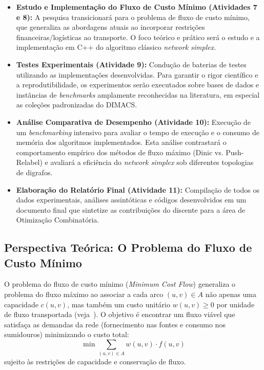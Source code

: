 \documentclass[12pt,a4paper]{article}
\begin{document}
\begin{itemize}
    \item \textbf{Estudo e Implementação do Fluxo de Custo Mínimo (Atividades 7 e 8):} A pesquisa transicionará para o problema de fluxo de custo mínimo, que generaliza as abordagens atuais ao incorporar restrições financeiras/logísticas ao transporte. O foco teórico e prático será o estudo e a implementação em C++ do algoritmo clássico \textit{network simplex}.
    \item \textbf{Testes Experimentais (Atividade 9):} Condução de baterias de testes utilizando as implementações desenvolvidas. Para garantir o rigor científico e a reprodutibilidade, os experimentos serão executados sobre bases de dados e instâncias de \textit{benchmarks} amplamente reconhecidas na literatura, em especial as coleções padronizadas do DIMACS.
    \item \textbf{Análise Comparativa de Desempenho (Atividade 10):} Execução de um \textit{benchmarking} intensivo para avaliar o tempo de execução e o consumo de memória dos algoritmos implementados. Esta análise contrastará o comportamento empírico dos métodos de fluxo máximo (Dinic vs. Push-Relabel) e avaliará a eficiência do \textit{network simplex} sob diferentes topologias de digrafos.
    \item \textbf{Elaboração do Relatório Final (Atividade 11):} Compilação de todos os dados experimentais, análises assintóticas e códigos desenvolvidos em um documento final que sintetize as contribuições do discente para a área de Otimização Combinatória.
\end{itemize}

\subsection{Perspectiva Teórica: O Problema do Fluxo de Custo Mínimo}

O problema do fluxo de custo mínimo (\textit{Minimum Cost Flow}) generaliza o problema do fluxo máximo ao associar a cada arco $(u,v) \in A$ não apenas uma capacidade $c(u,v)$, mas também um custo unitário $w(u,v) \ge 0$ por unidade de fluxo transportada (veja~\cite{ahuja1993network}). O objetivo é encontrar um fluxo viável que satisfaça as demandas da rede (fornecimento nas fontes e consumo nos sumidouros) minimizando o custo total:
\begin{equation}
    \min \sum_{(u,v) \in A} w(u,v) \cdot f(u,v)
\end{equation}
sujeito às restrições de capacidade e conservação de fluxo.
\end{document}
